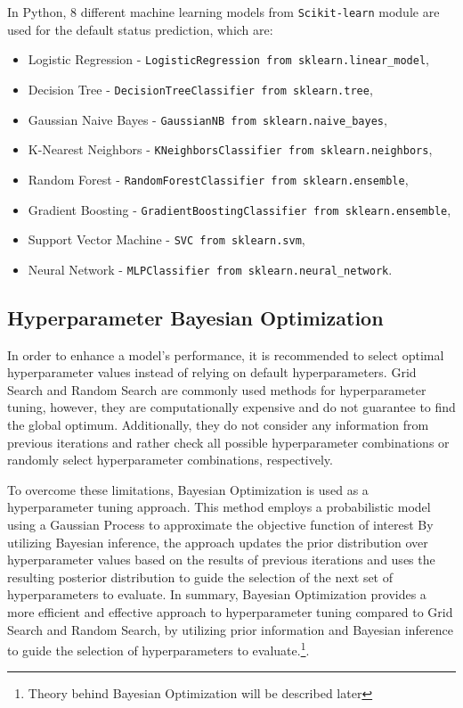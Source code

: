 In Python, 8 different machine learning models from \lstinline{Scikit-learn} module are used for the default status prediction, which are:
\begin{itemize}\setlength\itemsep{0em}
    \item Logistic Regression - \lstinline{LogisticRegression from sklearn.linear_model},
    \item Decision Tree - \lstinline{DecisionTreeClassifier from sklearn.tree},
    \item Gaussian Naive Bayes - \lstinline{GaussianNB from sklearn.naive_bayes},
    \item K-Nearest Neighbors - \lstinline{KNeighborsClassifier from sklearn.neighbors},
    \item Random Forest - \lstinline{RandomForestClassifier from sklearn.ensemble},
    \item Gradient Boosting - \lstinline{GradientBoostingClassifier from sklearn.ensemble},
    \item Support Vector Machine - \lstinline{SVC from sklearn.svm},
    \item Neural Network - \lstinline{MLPClassifier from sklearn.neural_network}.
\end{itemize}

\subsection{Hyperparameter Bayesian Optimization}

In order to enhance a model's performance, it is recommended to select optimal hyperparameter values instead of relying on default hyperparameters.
Grid Search and Random Search are commonly used methods for hyperparameter tuning, however, they are computationally expensive and do not guarantee to find the global optimum.
Additionally, they do not consider any information from previous iterations and rather check all possible hyperparameter combinations or randomly select hyperparameter combinations, respectively.

To overcome these limitations, Bayesian Optimization is used as a hyperparameter tuning approach.
This method employs a probabilistic model using a Gaussian Process to approximate the objective function of interest
 By utilizing Bayesian inference, the approach updates the prior distribution over hyperparameter values based on the results of previous iterations and uses the resulting posterior distribution to guide the selection of the next set of hyperparameters to evaluate.
In summary, Bayesian Optimization provides a more efficient and effective approach to hyperparameter tuning compared to Grid Search and Random Search, by utilizing prior information and Bayesian inference to guide the selection of hyperparameters to evaluate.\footnote{Theory behind Bayesian Optimization will be described later}.





